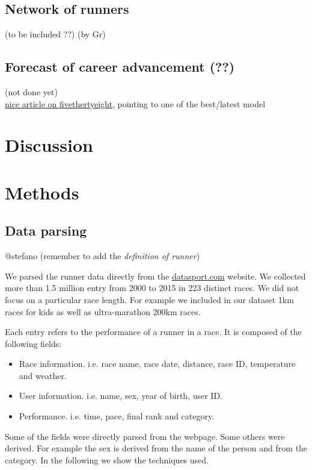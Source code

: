 \documentclass[fleqn,10pt]{wlscirep}
\begin{document}
		\subsection*{Network of runners}
	
				(to be included ??)
				(by Gr)
		
		\subsection*{Forecast of career advancement (??)}
	
				(not done yet)		\\
				\href{https://fivethirtyeight.com/features/tell-us-two-things-and-well-tell-you-how-fast-youd-run-a-marathon/}{nice article on fivethertyeight},
				pointing to one of the best/latest model \cite{vickers2016empirical}

	

\section*{Discussion}


\section*{Methods}


	\subsection*{Data parsing}
	
		@stefano 
		(remember to add the \textit{definition of runner})
	
        We parsed the runner data directly from the \url{datasport.com} website. 
        We collected more than 1.5 million entry from 2000 to 2015 in 223 distinct races.
        We did not focus on a particular race length. For example we included in our dataset 
        1km races for kids as well as ultra-marathon 200km races.

        Each entry refers to the performance of a runner in a race. It is composed of the following 
        fields:
        \begin{itemize}
            \item Race information. i.e. race name, race date, distance, race ID, temperature and weather.
            \item User information. i.e. name, sex, year of birth, user ID.
            \item Performance. i.e. time, pace, final rank and category.
        \end{itemize}
        Some of the fields were directly parsed from the webpage. Some others were derived. For
        example the sex is derived from the name of the person and from the category.
        In the following we show the techniques used.
\end{document}
